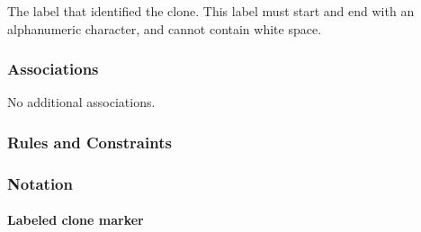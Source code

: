 \begin{attributes}
   The label that identified the clone. This
  label must start and end with an alphanumeric character, and cannot
  contain white space.
\end{attributes}

\subsubsection{Associations}

No additional associations.

\subsubsection{Rules and Constraints}

\begin{valrules}
\end{valrules}


\subsubsection{Notation}

\paragraph{Labeled clone marker}

